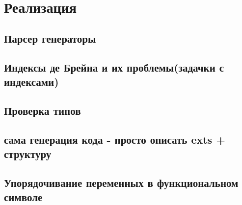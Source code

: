 \section{Реализация}


\subsection{Парсер генераторы}

\subsection{Индексы де Брейна и их проблемы(задачки с индексами)}

\subsection{Проверка типов}

\subsection{сама генерация кода - просто описать exts + структуру}

\subsection{Упорядочивание переменных в функциональном символе}\label{toposort}







